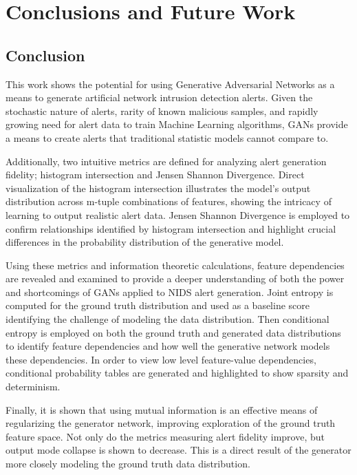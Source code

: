 \chapter{Conclusions and Future Work}

\section{Conclusion}

This work shows the potential for using Generative Adversarial Networks as a means to generate artificial network intrusion detection alerts. Given the stochastic nature of alerts, rarity of known malicious samples, and rapidly growing need for alert data to train Machine Learning algorithms, GANs provide a means to create alerts that traditional statistic models cannot compare to.  

Additionally, two intuitive metrics are defined for analyzing alert generation fidelity; histogram intersection and Jensen Shannon Divergence. Direct visualization of the histogram intersection illustrates the model's output distribution across m-tuple combinations of features, showing the intricacy of learning to output realistic alert data. Jensen Shannon Divergence is employed to confirm relationships identified by histogram intersection and highlight crucial differences in the probability distribution of the generative model.

Using these metrics and information theoretic calculations, feature dependencies are revealed and examined to provide a deeper understanding of both the power and shortcomings of GANs applied to NIDS alert generation. Joint entropy is computed for the ground truth distribution and used as a baseline score identifying the challenge of modeling the data distribution. Then conditional entropy is employed on both the ground truth and generated data distributions to identify feature dependencies and how well the generative network models these dependencies. In order to view low level feature-value dependencies, conditional probability tables are generated and highlighted to show sparsity and determinism. 

Finally, it is shown that using mutual information is an effective means of regularizing the generator network, improving exploration of the ground truth feature space. Not only do the metrics measuring alert fidelity improve, but output mode collapse is shown to decrease. This is a direct result of the generator more closely modeling the ground truth data distribution. 

